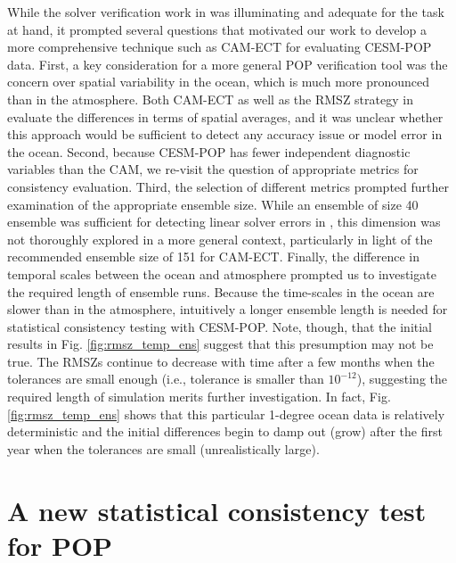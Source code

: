 \documentclass[gmd, manuscript]{copernicus}
\begin{document}
While the solver verification work in \cite{yong2015} was illuminating and adequate for the task at hand, it prompted several questions that motivated our work to develop a more comprehensive technique such as CAM-ECT for evaluating CESM-POP data.  First, a key consideration for a more general POP verification tool was the concern over spatial variability in the ocean, which is much more pronounced than in the atmosphere. Both CAM-ECT as well as the RMSZ strategy in \cite{yong2015} evaluate the differences in terms of spatial averages, and it was unclear whether this approach would be sufficient to detect any accuracy issue or model error in the ocean.  Second, because CESM-POP has fewer independent diagnostic variables than the CAM, we re-visit the question of appropriate metrics for consistency evaluation.  Third, the selection of different metrics prompted further examination of the appropriate ensemble size.  While an ensemble of size 40 ensemble was sufficient for detecting linear solver errors in \cite{yong2015}, this dimension was not thoroughly explored in a more general context, particularly in light of the recommended ensemble size of 151 for CAM-ECT.  Finally, the difference in temporal scales between the ocean and atmosphere prompted us to investigate the required length of ensemble runs.  Because the time-scales in the ocean are slower than in the atmosphere, intuitively a longer ensemble length is needed for statistical consistency testing with CESM-POP.  Note, though, that the initial results in Fig. \ref{fig:rmsz_temp_ens} suggest that this presumption may not be true.  The RMSZs continue to decrease with time after a few months when the tolerances are small enough (i.e., tolerance is smaller than $10^{-12}$), suggesting the required length of simulation merits further investigation.  In fact, Fig. \ref{fig:rmsz_temp_ens} shows that this particular 1-degree ocean data is relatively deterministic and the initial differences begin to damp out (grow) after the first year when the tolerances are small (unrealistically large).




\section{A new statistical consistency test for POP}\label{sec:newtest}
\end{document}
